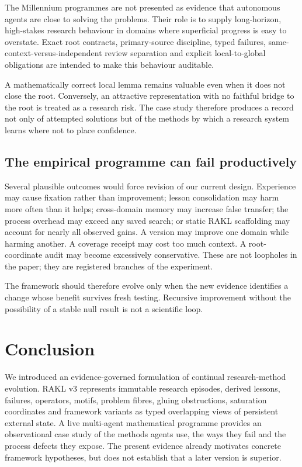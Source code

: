The Millennium programmes are not presented as evidence that autonomous agents are close to solving the problems. Their role is to supply long-horizon, high-stakes research behaviour in domains where superficial progress is easy to overstate. Exact root contracts, primary-source discipline, typed failures, same-context-versus-independent review separation and explicit local-to-global obligations are intended to make this behaviour auditable.

A mathematically correct local lemma remains valuable even when it does not close the root. Conversely, an attractive representation with no faithful bridge to the root is treated as a research risk. The case study therefore produces a record not only of attempted solutions but of the methods by which a research system learns where not to place confidence.

\subsection{The empirical programme can fail productively}

Several plausible outcomes would force revision of our current design. Experience may cause fixation rather than improvement; lesson consolidation may harm more often than it helps; cross-domain memory may increase false transfer; the process overhead may exceed any saved search; or static RAKL scaffolding may account for nearly all observed gains. A version may improve one domain while harming another. A coverage receipt may cost too much context. A root-coordinate audit may become excessively conservative. These are not loopholes in the paper; they are registered branches of the experiment.

The framework should therefore evolve only when the new evidence identifies a change whose benefit survives fresh testing. Recursive improvement without the possibility of a stable null result is not a scientific loop.

\section{Conclusion}

We introduced an evidence-governed formulation of continual research-method evolution. RAKL v3 represents immutable research episodes, derived lessons, failures, operators, motifs, problem fibres, gluing obstructions, saturation coordinates and framework variants as typed overlapping views of persistent external state. A live multi-agent mathematical programme provides an observational case study of the methods agents use, the ways they fail and the process defects they expose. The present evidence already motivates concrete framework hypotheses, but does not establish that a later version is superior.

